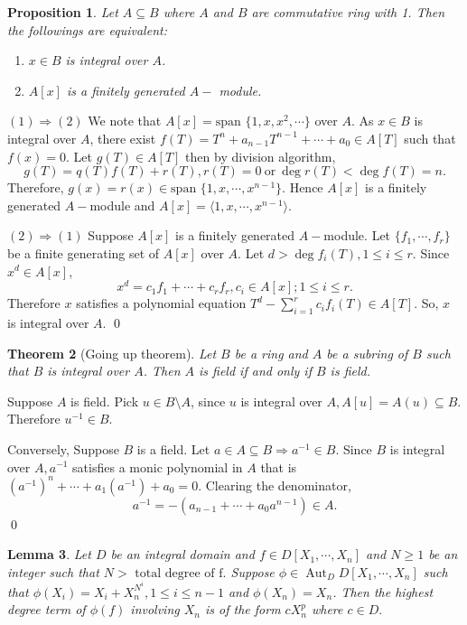 \documentclass[11pt]{amsart}
\newtheorem{theorem}{Theorem}[section]
\newtheorem{prop}[theorem]{Proposition}
\newtheorem{lemma}[theorem]{Lemma}%
\newcommand{\gen}[1]{\langle#1\rangle}
\newcommand{\Span}[1]{\text{span~}\{#1\}}
\DeclareMathOperator{\aut}{\text{Aut}}
\begin{document}
\begin{prop}

Let $A\subseteq B$ where $A$ and $B$ are commutative ring with 1. Then the followings are equivalent: \begin{enumerate}
\item $x\in B$ is integral over $A$.

\item $A[x]$ is a finitely generated $A-$ module.
\end{enumerate}

\end{prop}

\proof $(1)\Rightarrow (2)$ We note that $A[x]=\Span{1,x,x^2,\cdots}$ over $A$. As $x\in B$ is integral over $A$, there exist $f(T)=T^n+a_{n-1}T^{n-1}+\cdots+a_0\in A[T]$ such that $f(x)=0.$ Let $g(T)\in A[T]$ then by division algorithm, $$g(T)=q(T)f(T)+r(T),r(T)=0~\text{or}~\deg r(T)<\deg f(T)=n.$$ Therefore, $g(x)=r(x)\in\Span{1,x,\cdots,x^{n-1}}.$ Hence $A[x]$ is a finitely generated $A-$module and $A[x]=\gen{1,x,\cdots,x^{n-1}}.$


$(2) \Rightarrow (1)$ Suppose $A[x]$ is a finitely generated $A-$module. Let $\{f_1,\cdots,f_r\}$ be a finite generating set of $A[x]$ over $A.$ Let $d>\deg f_i(T),1\leq i\leq r$. Since $x^d\in A[x]$, $$x^d=c_1f_1+\cdots+c_rf_r,c_i\in A[x];1\leq i\leq r.$$ Therefore $x$ satisfies a polynomial equation $T^d-\displaystyle\sum_{i=1}^r c_if_i(T)\in A[T].$ So, $x$ is integral over $A.$ \qed 

\begin{theorem}[Going up theorem]

Let $B$ be a ring and $A$ be a subring of $B$ such that $B$ is integral over $A$. Then $A$ is field if and only if $B$ is field.

\end{theorem}

\proof Suppose $A$ is field. Pick $u\in B\setminus A$, since $u$ is integral over $A, A[u]=A(u)\subseteq B$. Therefore $u^{-1}\in B.$

Conversely, Suppose $B$ is a field. Let $a\in A\subseteq B \Rightarrow a^{-1}\in B.$ Since $B$ is integral over $A, a^{-1}$ satisfies a monic polynomial in $A$ that is $(a^{-1})^n+\cdots+a_1(a^{-1})+a_0=0.$ Clearing the denominator, $$a^{-1}=-(a_{n-1}+\cdots+a_0a^{n-1})\in A.$$ \qed

\begin{lemma}

Let $D$ be an integral domain and $f\in D[X_1,\cdots,X_n]$ and $N\geq 1$ be an integer such that $N>\text{~total degree of f}.$ Suppose $\phi\in \aut_D D[X_1,\cdots,X_n]$ such that $\phi(X_i)=X_i+X_n^{N^i},1\leq i\leq n-1$ and $\phi(X_n)=X_n$. Then the highest degree term of $\phi(f)$ involving $X_n$ is of the form $cX_n^p$ where $c\in D.$

\end{lemma}
\end{document}
